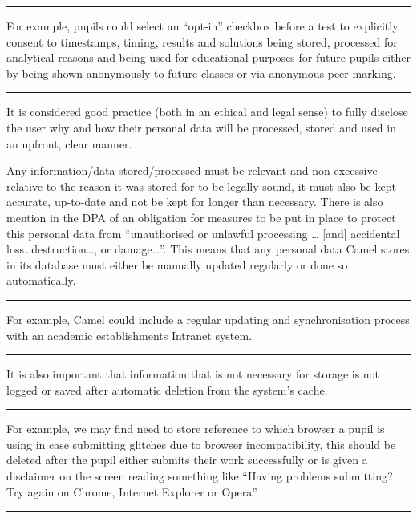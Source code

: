 \vspace{0.2cm}
\hrule
\begin{flushright}
\scriptsize For example, pupils could select an “opt-in” checkbox before a test to explicitly consent to timestamps, timing, results and solutions being stored, processed for analytical reasons and being used for educational purposes for future pupils either by being shown anonymously  to future classes or via anonymous peer marking.
\end{flushright}
\hrule
\vspace{0.2cm}

It is considered good practice (both in an ethical and legal sense) to fully disclose the user why and how their personal data will be processed, stored and used in an upfront, clear manner. 

    Any information/data stored/processed must be relevant and non-excessive relative to the reason it was stored for to be legally sound, it must also be kept accurate, up-to-date and not be kept for longer than necessary. There is also mention in the DPA of an obligation for measures to be put in place to protect this personal data from “unauthorised or unlawful processing … [and] accidental loss\ldots destruction\ldots, or damage\ldots”.\cite{DPA:tDPP:S1} This means that any personal data Camel stores in its database must either be manually updated regularly or done so automatically.

\vspace{0.2cm}
\hrule
\begin{flushright}
\scriptsize For example, Camel could include a regular updating and synchronisation process with an academic establishments Intranet system.
\end{flushright}
\hrule
\vspace{0.2cm}

It is also important that information that is not necessary for storage is not logged or saved after automatic deletion from the system’s cache.

\newpage %
\hrule
\begin{flushright}
\scriptsize  For example, we may find need to store reference to which browser a pupil is using in case submitting glitches due to  browser incompatibility, this should be deleted after the pupil either submits their work successfully or is given a disclaimer on the screen reading something like “Having problems submitting? Try again on Chrome, Internet Explorer or Opera”.
\end{flushright}
\hrule
\vspace{0.2cm}

